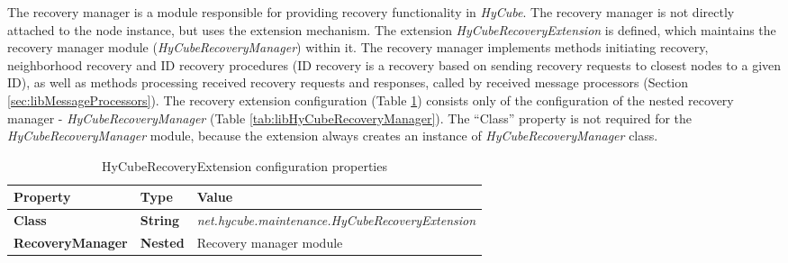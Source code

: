 The recovery manager is a module responsible for providing recovery functionality in \emph{HyCube}. The recovery manager is not directly attached to the node instance, but uses the extension mechanism. The extension \emph{HyCubeRecoveryExtension} is defined, which maintains the recovery manager module (\emph{HyCubeRecoveryManager}) within it. The recovery manager implements methods initiating recovery, neighborhood recovery and ID recovery procedures (ID recovery is a recovery based on sending recovery requests to closest nodes to a given ID), as well as methods processing received recovery requests and responses, called by received message processors (Section \ref{sec:libMessageProcessors}). The recovery extension configuration (Table \ref{tab:libHyCubeRecoveryExtension}) consists only of the configuration of the nested recovery manager - \emph{HyCubeRecoveryManager} (Table \ref{tab:libHyCubeRecoveryManager}). The ``Class'' property is not required for the \emph{HyCubeRecoveryManager} module, because the extension always creates an instance of \emph{HyCubeRecoveryManager} class.


\begin{table}
\scriptsize
\begin{center}
\begin{tabular}{p{5cm} p{1.5cm} p{8.0cm}}
	\hline
	\textbf{Property}						& \textbf{Type}					& \textbf{Value}					\\[1mm]
    \hline
	\textbf{Class}							& \textbf{String}				& \textit{net.hycube.maintenance.HyCubeRecoveryExtension}									\\[1.5mm]	
	\textbf{RecoveryManager}				& \textbf{Nested}				& Recovery manager module																	\\[1.5mm]	
    \hline
\end{tabular}
\end{center}
\caption{HyCubeRecoveryExtension configuration properties}
\label{tab:libHyCubeRecoveryExtension}
\end{table}

